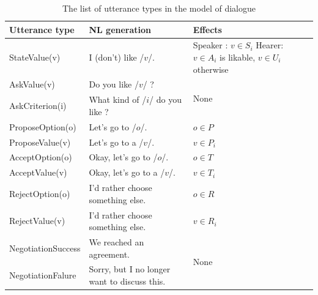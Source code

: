 \documentclass{llncs}
\begin{document}
		\begin{table}[t]
			{\scriptsize
				\begin{tabular} {|p{2.75cm}|p{4cm}|p{3cm}|}
					\hline
					\textbf{Utterance type}  &\textbf{ NL generation} & \textbf{Effects}\\
					\hline
					StateValue(v) &  I (don't) like /$v$/. & Speaker : $v \in S_i$ \newline Hearer:  \newline $v\in A_i$ is likable, $v\in U_i$ otherwise \\
					\hline
					AskValue(v)& Do you like /$v$/ ? & \multirow{2}{*}{None} \\
					
					AskCriterion(i) &  What kind of /$i$/ do you like ? & \\
					\hline
					ProposeOption(o)  & Let's go to /$o$/. & $o \in P$\\
					
					ProposeValue(v) & Let's go to a /$v$/. & $v \in P_i$\\
					\hline
					AcceptOption(o)& Okay, let's go to /$o$/.& $o \in T$ \\
					
					AcceptValue(v) & Okay, let's go to a /$v$/.& $v \in T_i$ \\
					\hline
					RejectOption(o) & I'd rather choose  something else. & $o \in R$\\
					
					RejectValue(v) &  I'd rather choose  something else. & $v \in R_i$ \\
					\hline
					NegotiationSuccess &  We reached an agreement. & \multirow{2}{*}{None}\\
					\cline{1-2}
					NegotiationFalure &  Sorry, but I no longer want to discuss this. & \\
					\hline
				\end{tabular}
			}
			\caption{\label{table:utt}The list of utterance types in the model of dialogue}
		\end{table}
		
\end{document}

